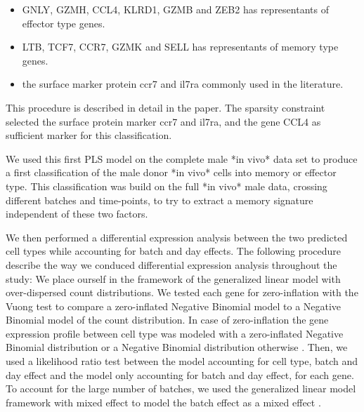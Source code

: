 \documentclass[a4paper,12pt]{article}
\begin{document}
\begin{itemize}
  \item GNLY, GZMH, CCL4, KLRD1, GZMB and ZEB2 has representants of effector type genes.
  \item LTB, TCF7, CCR7, GZMK and SELL has representants of memory type genes.
  \item the surface marker protein ccr7 and il7ra commonly used in the literature.
\end{itemize}

This procedure is described in detail in the \citep{durifHighDimensionalClassification2018} paper.
The sparsity constraint selected the surface protein marker ccr7 and il7ra, and the gene CCL4 as sufficient marker for this classification.

We used this first PLS model on the complete male *in vivo* data set to produce a first classification of the male donor *in vivo* cells into memory or effector type.
This classification was build on the full *in vivo* male data, crossing different batches and time-points, to try to extract a memory signature independent of these two factors.

We then performed a differential expression analysis between the two predicted cell types while accounting for batch and day effects.
The following procedure describe the way we conduced differential expression analysis throughout the study:
We place ourself in the framework of the generalized linear model with over-dispersed count distributions.
We tested each gene for zero-inflation with the Vuong test \cite{vuongLikelihoodRatioTests1989} to compare a zero-inflated Negative Binomial model to a Negative Binomial model of the count distribution.
In case of zero-inflation the gene expression profile between cell type was modeled with a zero-inflated Negative Binomial distribution or a Negative Binomial distribution otherwise \cite{venablesModernAppliedStatistics2002, zeileisRegressionModelsCount2008}.
Then, we used a likelihood ratio test between the model accounting for cell type, batch and day effect and the model only accounting for batch and day effect, for each gene.
To account for the large number of batches, we used the generalized linear model framework with mixed effect to model the batch effect as a mixed effect \cite{fournierADModelBuilder2012, skaugGeneralizedLinearMixed2016}.
\end{document}
